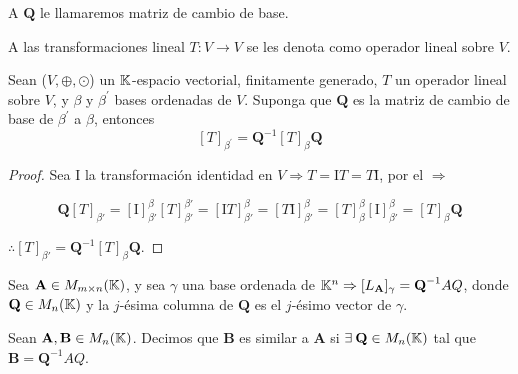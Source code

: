 \begin{notation}
    A $\textbf{Q}$ le llamaremos matriz de cambio de base.
\end{notation}

\begin{definition} 
    A las transformaciones lineal $T:V \to V$ se les denota como operador lineal sobre $V$.
\end{definition}

\begin{theorem}
    Sean ($V, \oplus, \odot$) un $\mathbb{K}$-espacio vectorial, finitamente generado, $T$ un operador lineal sobre $V$, y $\beta$ y ${\beta}^{\prime}$ bases ordenadas de $V$. Suponga que $\textbf{Q}$ es la matriz de cambio de base de ${\beta}^{\prime}$ a $\beta$, entonces $$[T]_{{\beta}^{\prime}}={\textbf{Q}}^{-1}[T]_{\beta}\textbf{Q}$$
\end{theorem}

\begin{proof}
    Sea $\mathrm{I}$ la transformación identidad en $V \Rightarrow T=\mathrm{I}T=T\mathrm{I}$, por el  $\Rightarrow$
    
    $$\textbf{Q}[T]_{\beta'}=[\mathrm{I}]_{\beta'}^{\beta}[T]_{\beta'}^{\beta'}=[\mathrm{I}T]_{\beta'}^{\beta}=[T\mathrm{I}]_{\beta'}^{\beta}=[T]_{\beta}^{\beta}[\mathrm{I}]_{\beta'}^{\beta}=[T]_{\beta}\textbf{Q}$$ 
    
    $\therefore [T]_{\beta'}={\textbf{Q}}^{-1}[T]_{\beta}\textbf{Q}$.
\end{proof}

\begin{corollary}
    Sea $\textbf{A} \in M_{m \times n}(\mathbb{K})$, y sea $\gamma$ una base ordenada de $\mathbb{K}^n \Rightarrow [L_{\textbf{A}}]_{\gamma}={\textbf{Q}}^{-1}AQ$, donde $\textbf{Q} \in M_n(\mathbb{K})$ y la $j$-ésima columna de $\textbf{Q}$ es el $j$-ésimo vector de $\gamma$.
\end{corollary}

\begin{definition} 
    Sean $\textbf{A},\textbf{B} \in M_n(\mathbb{K})$. Decimos que $\textbf{B}$ es similar a $\textbf{A}$ si $\exists \: \textbf{Q} \in M_n(\mathbb{K})$ tal que $\textbf{B}={\textbf{Q}}^{-1}AQ$. 
\end{definition}
